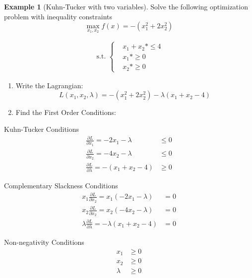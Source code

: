 \documentclass[
]{book}
\theoremstyle{definition}
\theoremstyle{definition}
\newtheorem{example}{Example}[chapter]
\theoremstyle{definition}
\theoremstyle{definition}
\theoremstyle{remark}
\begin{document}
\begin{example}[Kuhn-Tucker with two variables]
\protect\hypertarget{exm:unnamed-chunk-250}{}{\label{exm:unnamed-chunk-250} {} }Solve the following optimization problem with inequality constraints
\[\max_{x_1,x_2} f(x) = -(x_1^2 + 2x_2^2)\]

\begin{align*}
\text{ s.t. } 
\begin{cases}
&x_1 + x_2 *\le 4\\
&x_1 *\ge 0\\
&x_2 *\ge 0
\end{cases}
\end{align*}
\end{example}

\begin{enumerate}
\def\labelenumi{\arabic{enumi}.}
\item
  Write the Lagrangian:
  \[L(x_1, x_2, \lambda) =  -(x_1^2 + 2x_2^2) - \lambda(x_1 + x_2 - 4)\]
\item
  Find the First Order Conditions:
\end{enumerate}

Kuhn-Tucker Conditions
\begin{align*}
\frac{\partial L}{\partial x_1} = -2x_1 - \lambda  &\leq 0\\
\frac{\partial L}{\partial x_2}  = -4x_2 - \lambda & \leq  0\\
\frac{\partial L}{\partial \lambda} = -(x_1 + x_2 - 4)& \geq 0
\end{align*}

Complementary Slackness Conditions
\begin{align*}
x_1\frac{\partial L}{\partial x_2} = x_1(-2x_1 - \lambda)  &= 0\\
x_2\frac{\partial L}{\partial x_2} = x_2(-4x_2 - \lambda)  &= 0\\
\lambda\frac{\partial L}{\partial \lambda} = -\lambda(x_1 + x_2 - 4)&= 0
\end{align*}

Non-negativity Conditions
\begin{align*}
x_1 & \geq  0\\
x_2 & \geq 0\\
\lambda & \geq 0
\end{align*}
\end{document}
